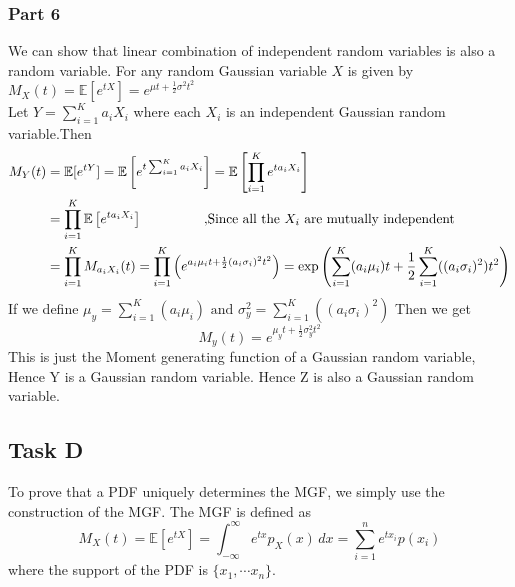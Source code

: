 \subsubsection{Part 6}
    We can show that linear combination of independent random variables is also a random variable. For any random Gaussian variable $X$ is given by $M_X(t)=\mathbb{E}[e^{tX}]=e^{\mu t+\frac{1}{2} \sigma^2t^2}$\\
    Let $Y=\sum_{i=1}^K a_i X_i$ where each $X_i$ is an independent Gaussian random variable.Then 
    \begin{align*}
        M_Y(t) &= \mathbb{E}[e^{tY}]= \mathbb{E}\left[e^{t\sum_{i=1}^K a_i X_i}\right] = \mathbb{E}\left[\prod_{i=1}^Ke^{ta_i X_i}\right]\\
        &=\prod_{i=1}^K\mathbb{E}\left[e^{ta_i X_i}\right] \hspace{15mm} \text{ ,Since all the $X_i$ are mutually independent}\\
        &= \prod_{i=1}^KM_{a_iX_i}(t) =\prod_{i=1}^K\left(  e^{a_i\mu_i t+\frac{1}{2} (a_i\sigma_i)^2t^2}\right) = \exp\left({\sum_{i=1}^K(a_i\mu_i) t+\frac{1}{2} \sum_{i=1}^K((a_i\sigma_i)^2)t^2}\right)\\
    \end{align*}
    If we define $\mu_y = \sum_{i=1}^K(a_i\mu_i)\text{ and }\sigma_y^2 = \sum_{i=1}^K((a_i\sigma_i)^2)$ Then we get 
    \begin{equation}
        M_y(t) = e^{\mu_y t+\frac{1}{2} \sigma_y^2t^2}
    \end{equation}
    This is just the Moment generating function of a Gaussian random variable, Hence Y is a Gaussian random variable. Hence Z is also a Gaussian random variable.
\subsection{Task D}
To prove that a PDF uniquely determines the MGF, we simply use the construction of the MGF. The MGF is defined as
\[
M_X(t) = \mathbb{E}[e^{tX}] = \int_{-\infty}^{\infty} e^{tx} p_X(x) \, dx = \sum_{i=1}^n e^{tx_i} p(x_i)
\]
where the support of the PDF is $\{x_1,\cdots x_n\}$.\\

